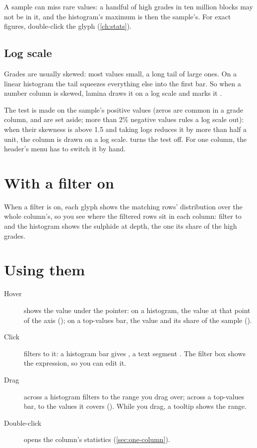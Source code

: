 A sample can miss rare values: a handful of high grades in ten million blocks may not be in it, and the
histogram's maximum is then the sample's. For exact figures, double-click the glyph (\cref{ch:stats}).

\subsection{Log scale}\label{sec:auto-log}

Grades are usually skewed: most values small, a long tail of large ones. On a linear histogram the tail
squeezes everything else into the first bar. So when a number column is skewed, lamina draws it on a
log scale and marks it .

The test is made on the sample's positive values (zeros are common in a grade column, and are set aside;
more than 2\% negative values rules a log scale out): when their skewness is above 1.5 and taking logs
reduces it by more than half a unit, the column is drawn on a log scale.  turns the test off. For one column, the header's menu has  to switch it by
hand.

\section{With a filter on}\label{sec:gutter-filtered}

When a filter is on, each glyph shows the matching rows' distribution over the whole column's, so you
see where the filtered rows sit in each column: filter to  and the 
histogram shows the sulphide at depth, the  one its share of the high grades.

\section{Using them}\label{sec:gutter-use}

\begin{description}
\item[Hover] shows the value under the pointer: on a histogram, the value at that point of the axis
(); on a top-values bar, the value and its share of the sample ().
\item[Click] filters to it: a histogram bar gives , a text
segment . The filter box shows the expression, so you can edit it.
\item[Drag] across a histogram filters to the range you drag over; across a top-values bar, to the
values it covers (). While you drag, a tooltip shows the range.
\item[Double-click] opens the column's statistics (\cref{sec:one-column}).
\end{description}

